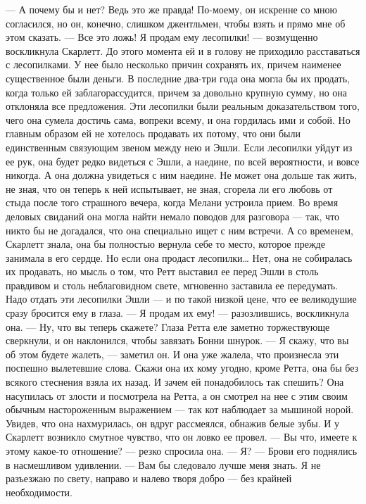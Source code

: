 — А почему бы и нет? Ведь это же правда! По-моему, он искренне со мною согласился, но он, конечно, слишком джентльмен, чтобы взять и прямо мне об этом сказать.
— Все это ложь! Я продам ему лесопилки! — возмущенно воскликнула Скарлетт.
До этого момента ей и в голову не приходило расставаться с лесопилками. У нее было несколько причин сохранять их, причем наименее существенное были деньги. В последние два-три года она могла бы их продать, когда только ей заблагорассудится, причем за довольно крупную сумму, но она отклоняла все предложения.
Эти лесопилки были реальным доказательством того, чего она сумела достичь сама, вопреки всему, и она гордилась ими и собой. Но главным образом ей не хотелось продавать их потому, что они были единственным связующим звеном между нею и Эшли. Если лесопилки уйдут из ее рук, она будет редко видеться с Эшли, а наедине, по всей вероятности, и вовсе никогда. А она должна увидеться с ним наедине. Не может она дольше так жить, не зная, что он теперь к ней испытывает, не зная, сгорела ли его любовь от стыда после того страшного вечера, когда Мелани устроила прием. Во время деловых свиданий она могла найти немало поводов для разговора — так, что никто бы не догадался, что она специально ищет с ним встречи. А со временем, Скарлетт знала, она бы полностью вернула себе то место, которое прежде занимала в его сердце. Но если она продаст лесопилки…
Нет, она не собиралась их продавать, но мысль о том, что Ретт выставил ее перед Эшли в столь правдивом и столь неблаговидном свете, мгновенно заставила ее передумать. Надо отдать эти лесопилки Эшли — и по такой низкой цене, что ее великодушие сразу бросится ему в глаза.
— Я продам их ему! — разозлившись, воскликнула она. — Ну, что вы теперь скажете?
Глаза Ретта еле заметно торжествующе сверкнули, и он наклонился, чтобы завязать Бонни шнурок.
— Я скажу, что вы об этом будете жалеть, — заметил он. И она уже жалела, что произнесла эти поспешно вылетевшие слова. Скажи она их кому угодно, кроме Ретта, она бы без всякого стеснения взяла их назад. И зачем ей понадобилось так спешить? Она насупилась от злости и посмотрела на Ретта, а он смотрел на нее с этим своим обычным настороженным выражением — так кот наблюдает за мышиной норой. Увидев, что она нахмурилась, он вдруг рассмеялся, обнажив белые зубы. И у Скарлетт возникло смутное чувство, что он ловко ее провел.
— Вы что, имеете к этому какое-то отношение? — резко спросила она.
— Я? — Брови его поднялись в насмешливом удивлении. — Вам бы следовало лучше меня знать. Я не разъезжаю по свету, направо и налево творя добро — без крайней необходимости.




